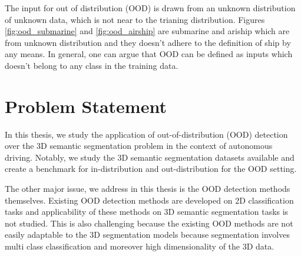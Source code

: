 The input for out of distribution (OOD) is drawn from an unknown distribution of unknown data, which is not near to the trianing distribution.
Figures \ref{fig:ood_submarine} and \ref{fig:ood_airship} are submarine and ariship which are from unknown distribution and they doesn't adhere to the definition of ship by any means.
In general, one can argue that OOD can be defined as inputs which doesn't belong to any class in the training data.


\section{Problem Statement}
In this thesis, we study the application of out-of-distribution (OOD) detection over the 3D semantic segmentation problem in the context of autonomous driving.
Notably, we study the 3D semantic segmentation datasets available and create a benchmark for in-distribution and out-distribution for the OOD setting.

The other major issue, we address in this thesis is the OOD detection methods themselves.
Existing OOD detection methods are developed on 2D classification tasks and applicability of these methods on 3D semantic segmentation tasks is not studied. 
This is also challenging because the existing OOD methods are not easily adaptable to the 3D segmentation models because segmentation involves multi class classification and moreover high dimensionality of the 3D data.
\newline

